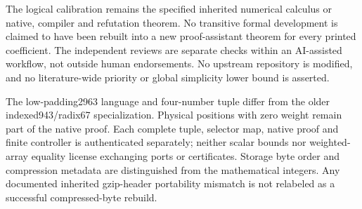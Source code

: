 \documentclass[11pt]{article}
\theoremstyle{definition}\newtheorem{definition}[theorem]{Definition}
\theoremstyle{remark}\newtheorem{remark}[theorem]{Remark}
\begin{document}
The logical calibration remains the specified inherited numerical calculus
or native, compiler and refutation theorem. No transitive formal development is
claimed to have been rebuilt into a new proof-assistant theorem for every
printed coefficient. The independent reviews are separate checks within
an AI-assisted workflow, not outside human endorsements. No upstream
repository is modified, and no literature-wide priority or global
simplicity lower bound is asserted.

The low-padding2963 language and four-number tuple differ from the older
indexed943/radix67 specialization. Physical positions with zero weight
remain part of the native proof. Each complete tuple, selector map, native
proof and finite controller is authenticated separately; neither scalar
bounds nor weighted-array equality license exchanging ports or certificates.
Storage byte order and compression metadata are distinguished from the
mathematical integers. Any documented inherited gzip-header portability
mismatch is not relabeled as a successful compressed-byte rebuild.
\appendix


\end{document}
